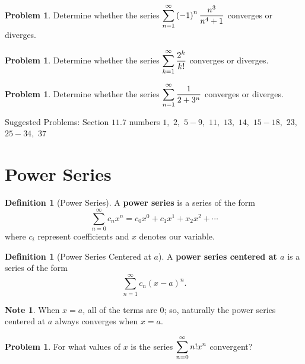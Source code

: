 \documentclass[letterpaper, twoside, 12pt]{book}
\theoremstyle{definition}
\theoremstyle{definition}
\newtheorem{definition}[theorem]{Definition}
\newtheorem{problem}[theorem]{Problem}
\newtheorem{note}[theorem]{Note}
\newcommand{\ds}{\ensuremath{\displaystyle}}
\begin{document}
\vfill

\begin{problem}
 Determine whether the series $\ds \sum_{n = 1}^{\infty} \left(-1\right)^n \frac{n^3}{n^4+1}$ converges or diverges.
\end{problem}

\vfill

\newpage

\begin{problem}
 Determine whether the series $\ds \sum_{k = 1}^{\infty} \frac{2^k}{k!}$ converges or diverges.
\end{problem}

\vfill

\begin{problem}
 Determine whether the series $\ds \sum_{n = 1}^{\infty} \frac{1}{2+3^n}$ converges or diverges.
\end{problem}

\vfill

\noindent Suggested Problems: Section $11.7$ numbers $1,$ $2,$ $5 - 9,$ $11,$ $13,$ $14,$ $15 - 18,$ $23,$ $25 - 34,$ $37$

\newpage

\section{Power Series}

\begin{definition}[Power Series]
 A \textbf{power series} is a series of the form $$\sum_{n=0}^{\infty} c_nx^n = c_0x^0+c_1x^1+x_2x^2 + \cdots$$ where $c_i$ represent coefficients and $x$ denotes our variable.
\end{definition}

\begin{definition}[Power Series Centered at $a$]
 A \textbf{power series centered at $a$} is a series of the form $$\sum_{n=1}^{\infty} c_n\left(x-a\right)^n.$$
\end{definition}

\begin{note}
 When $x=a$, all of the terms are $0$; so, naturally the power series centered at $a$ always converges when $x=a$.
\end{note}

\begin{problem}
 For what values of $x$ is the series $\ds \sum_{n=0}^{\infty} n! x^n$ convergent?
\end{problem}
\end{document}
